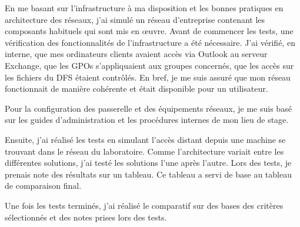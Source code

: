 En me basant sur l'infrastructure à ma disposition et les bonnes pratiques en architecture des réseaux, j'ai simulé un réseau d'entreprise contenant les composants habituels qui sont mis en œuvre.
Avant de commencer les tests, une vérification des fonctionnalités de l'infrastructure a été nécessaire.
J'ai vérifié, en interne, que mes ordinateurs clients avaient accès via Outlook au serveur Exchange,  que les GPOs s'appliquaient aux groupes concernés, que les accès sur les fichiers du DFS étaient contrôlés.
En bref, je me suis assuré que mon réseau fonctionnait de manière cohérente et était disponible pour un utilisateur.

Pour la configuration des passerelle et des équipements réseaux, je me suis basé sur les guides d'administration et les procédures internes de mon lieu de stage.

Ensuite, j'ai réalisé les tests en simulant l'accès distant depuis une machine se trouvant dans le réseau du laboratoire.
Comme l'architecture variait entre les différentes solutions, j'ai testé les solutions l'une après l'autre.
Lors des tests, je prenais note des résultats sur un tableau.
Ce tableau a servi de base au tableau de comparaison final.

Une fois les tests terminés, j'ai réalisé le comparatif sur des bases des critères sélectionnés et des notes prises lors des tests. 